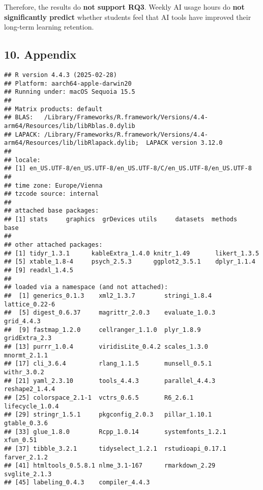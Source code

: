 \documentclass[
]{article}
\begin{document}
Therefore, the results do \textbf{not support RQ3}. Weekly AI usage
hours do \textbf{not significantly predict} whether students feel that
AI tools have improved their long-term learning retention.

\subsection{10. Appendix}\label{appendix}

\begin{verbatim}
## R version 4.4.3 (2025-02-28)
## Platform: aarch64-apple-darwin20
## Running under: macOS Sequoia 15.5
## 
## Matrix products: default
## BLAS:   /Library/Frameworks/R.framework/Versions/4.4-arm64/Resources/lib/libRblas.0.dylib 
## LAPACK: /Library/Frameworks/R.framework/Versions/4.4-arm64/Resources/lib/libRlapack.dylib;  LAPACK version 3.12.0
## 
## locale:
## [1] en_US.UTF-8/en_US.UTF-8/en_US.UTF-8/C/en_US.UTF-8/en_US.UTF-8
## 
## time zone: Europe/Vienna
## tzcode source: internal
## 
## attached base packages:
## [1] stats     graphics  grDevices utils     datasets  methods   base     
## 
## other attached packages:
## [1] tidyr_1.3.1      kableExtra_1.4.0 knitr_1.49       likert_1.3.5    
## [5] xtable_1.8-4     psych_2.5.3      ggplot2_3.5.1    dplyr_1.1.4     
## [9] readxl_1.4.5    
## 
## loaded via a namespace (and not attached):
##  [1] generics_0.1.3    xml2_1.3.7        stringi_1.8.4     lattice_0.22-6   
##  [5] digest_0.6.37     magrittr_2.0.3    evaluate_1.0.3    grid_4.4.3       
##  [9] fastmap_1.2.0     cellranger_1.1.0  plyr_1.8.9        gridExtra_2.3    
## [13] purrr_1.0.4       viridisLite_0.4.2 scales_1.3.0      mnormt_2.1.1     
## [17] cli_3.6.4         rlang_1.1.5       munsell_0.5.1     withr_3.0.2      
## [21] yaml_2.3.10       tools_4.4.3       parallel_4.4.3    reshape2_1.4.4   
## [25] colorspace_2.1-1  vctrs_0.6.5       R6_2.6.1          lifecycle_1.0.4  
## [29] stringr_1.5.1     pkgconfig_2.0.3   pillar_1.10.1     gtable_0.3.6     
## [33] glue_1.8.0        Rcpp_1.0.14       systemfonts_1.2.1 xfun_0.51        
## [37] tibble_3.2.1      tidyselect_1.2.1  rstudioapi_0.17.1 farver_2.1.2     
## [41] htmltools_0.5.8.1 nlme_3.1-167      rmarkdown_2.29    svglite_2.1.3    
## [45] labeling_0.4.3    compiler_4.4.3
\end{verbatim}
\end{document}
